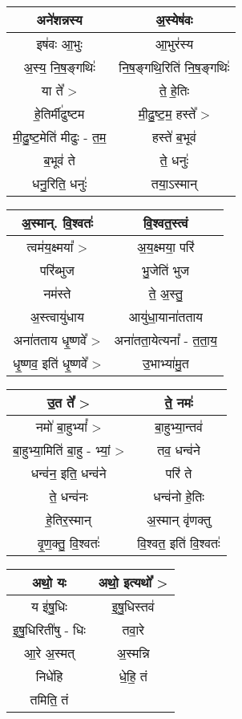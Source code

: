 {\centering
\begin{longtable}{|c|c|}
\hline
अने॑शन्नस्य                  & अ॒स्येष॑वः\\
\hline
इष॑वः आ॒भुः                 & आ॒भुर॑स्य\\
\hline
अ॒स्य॒ नि॒ष॒ङ्गथिः॑             & नि॒ष॒ङ्गथि॒रिति॑ नि॒ष॒ङ्गथिः॑\\
\hline
या ते᳚ >                   & ते॒ हे॒तिः\\
\hline
हे॒तिर्मी॑ढुष्टम               & मी॒ढु॒ष्ट॒म॒ हस्ते᳚ >\\
\hline
मी॒ढु॒ष्ट॒मेति॑ मीढुः - त॒म॒       & हस्ते॑ ब॒भूव॑\\
\hline
ब॒भूव॑ ते                    & ते॒ धनुः॑\\
\hline
धनु॒रिति॒ धनुः॑               & तया॒ऽस्मान्\\
\hline
\end{longtable}
}
{\centering
\begin{longtable}{|c|c|}
\hline
अ॒स्मान्. वि॒श्वतः॑            & वि॒श्वत॒स्त्वं\\
\hline
त्वम॑य॒क्ष्मया᳚ >              & अ॒य॒क्ष्मया॒ परि॑\\
\hline
परि॑ब्भुज                   & भु॒जेति॑ भुज\\
\hline
नम॑स्ते                     & ते॒ अ॒स्तु॒\\
\hline
अ॒स्त्वायु॑धाय                & आयु॑धा॒याना॑तताय\\
\hline
अना॑तताय धृ॒ष्णवे᳚ >           & अना॑तता॒येत्यना᳚ - त॒ता॒य॒\\
\hline
धृ॒ष्णव॒ इति॑ धृ॒ष्णवे᳚ >          & उ॒भाभ्या॑मु॒त\\
\hline
\end{longtable}
}
{\centering
\begin{longtable}{|c|c|}
\hline
उ॒त ते᳚ >                   & ते॒ नमः॑\\
\hline
नमो॑ बा॒हुभ्यां᳚ >             & बा॒हुभ्या॒न्तव॑\\
\hline
बा॒हुभ्या॒मिति॑ बा॒हु - भ्यां॒ >   & तव॒ धन्व॑ने\\
\hline
धन्व॑न॒ इति॒ धन्व॑ने            & परि॑ ते\\
\hline
ते॒ धन्व॑नः                  & धन्व॑नो हे॒तिः\\
\hline
हे॒तिर॒स्मान्                 & अ॒स्मान् वृ॑णक्तु\\
\hline
वृ॒ण॒क्तु॒ वि॒श्वतः॑              & वि॒श्वत॒ इति॑ वि॒श्वतः॑\\
\hline
\end{longtable}
}
{\centering
\begin{longtable}{|c|c|}
\hline
अथो॒ यः                   & अथो॒ इत्यथो᳚ >\\
\hline
य इ॑षु॒धिः                  & इ॒षु॒धिस्तव॑\\
\hline
इ॒षु॒धिरिती॑षु - धिः          & तवा॒रे\\
\hline
आ॒रे अ॒स्मत्                  & अ॒स्मन्नि\\
\hline
निधे॑हि                    & धे॒हि॒ तं\\
\hline
तमिति॒ तं                  & \\
\hline
\end{longtable}
}
